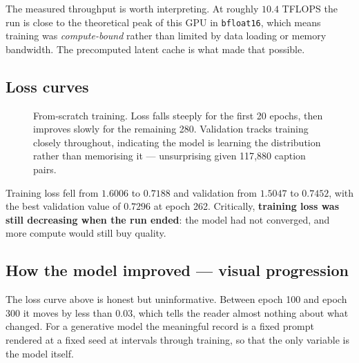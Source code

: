 \documentclass[11pt,a4paper]{article}
\begin{document}
The measured throughput is worth interpreting. At roughly $10.4$ TFLOPS the run
is close to the theoretical peak of this GPU in \texttt{bfloat16}, which means
training was \emph{compute-bound} rather than limited by data loading or memory
bandwidth. The precomputed latent cache is what made that possible.

\subsection{Loss curves}

\begin{figure}[htbp]
\centering
{}
\caption{From-scratch training. Loss falls steeply for the first 20 epochs, then
improves slowly for the remaining 280. Validation tracks training closely
throughout, indicating the model is learning the distribution rather than
memorising it --- unsurprising given 117{,}880 caption pairs.}
\label{fig:ditcurve}
\end{figure}

Training loss fell from $1.6006$ to $\mathbf{0.7188}$ and validation from
$1.5047$ to $0.7452$, with the best validation value of $\mathbf{0.7296}$ at
epoch 262. Critically, \textbf{training loss was still decreasing when the run
ended}: the model had not converged, and more compute would still buy quality.

\subsection{How the model improved --- visual progression}

The loss curve above is honest but uninformative. Between epoch 100 and epoch
300 it moves by less than $0.03$, which tells the reader almost nothing about
what changed. For a generative model the meaningful record is a fixed prompt
rendered at a fixed seed at intervals through training, so that the only
variable is the model itself.
\end{document}
